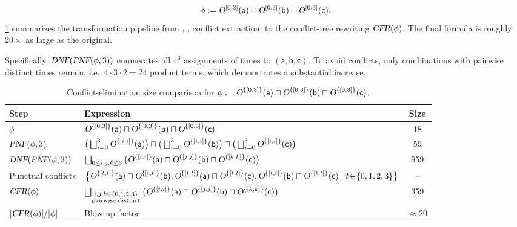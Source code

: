 \begin{example}
\[
\phi :=
\textsl{O}^{{[0,3]}}(\mathsf{\mathsf{a}}) \sqcap
\textsl{O}^{{[0,3]}}(\mathsf{\mathsf{b}}) \sqcap
\textsl{O}^{{[0,3]}}(\mathsf{\mathsf{c}}).
\]
\ref{table:ontic-triple-conflict} summarizes the transformation pipeline from \pnf, \dnf, conflict extraction, to the conflict-free rewriting $\textsl{CFR}(\phi)$.
The final formula is roughly $20\times$ as large as the original.

Specifically, $\textsl{DNF}(\textsl{PNF}(\phi,3))$ enumerates all $4^3$ assignments of times to $(\mathsf{a},\mathsf{b},\mathsf{c})$.
To avoid conflicts, only combinations with pairwise distinct times remain, i.e.\ $4\cdot3\cdot2=24$ product terms, which demonstrates a substantial increase.


\begin{table}[h]
\centering
\renewcommand{\arraystretch}{1.4}
\begin{tabular}{|l|p{8cm}|c|}
\hline
\textbf{Step} & \textbf{Expression} & \textbf{Size} \\ \hline
$\phi$ 
& $\textsl{O}^{\{[0,3]\}}(\mathsf{\mathsf{a}})\sqcap\textsl{O}^{\{[0,3]\}}(\mathsf{\mathsf{b}})\sqcap\textsl{O}^{\{[0,3]\}}(\mathsf{\mathsf{c}})$
& 18 \\ \hline
$\textsl{PNF}(\phi,3)$ 
& $\big(\bigsqcup_{i=0}^{3}\textsl{O}^{\{[i,i]\}}(\mathsf{\mathsf{a}})\big)
\sqcap\big(\bigsqcup_{i=0}^{3}\textsl{O}^{\{[i,i]\}}(\mathsf{\mathsf{b}})\big)
\sqcap\big(\bigsqcup_{i=0}^{3}\textsl{O}^{\{[i,i]\}}(\mathsf{\mathsf{c}})\big)$
& 59 \\ \hline
$\textsl{DNF}(\textsl{PNF}(\phi,3))$ 
& $\bigsqcup_{0\le i,j,k\le3}
  \big(\textsl{O}^{\{[i,i]\}}(\mathsf{\mathsf{a}})\sqcap
       \textsl{O}^{\{[j,j]\}}(\mathsf{\mathsf{b}})\sqcap
       \textsl{O}^{\{[k,k]\}}(\mathsf{\mathsf{c}})\big)$
& 959 \\ \hline
Punctual conflicts 
& $\big\{
\textsl{O}^{\{[t,t]\}}(\mathsf{\mathsf{a}})\sqcap\textsl{O}^{\{[t,t]\}}(\mathsf{\mathsf{b}}),
\textsl{O}^{\{[t,t]\}}(\mathsf{\mathsf{a}})\sqcap\textsl{O}^{\{[t,t]\}}(\mathsf{\mathsf{c}}),
\textsl{O}^{\{[t,t]\}}(\mathsf{\mathsf{b}})\sqcap\textsl{O}^{\{[t,t]\}}(\mathsf{\mathsf{c}})
\mid t\!\in\!\{0,1,2,3\}\big\}$ 
& -- \\ \hline
$\textsl{CFR}(\phi)$
& $\bigsqcup_{\substack{i,j,k\in\{0,1,2,3\}\\ \text{pairwise distinct}}}
  \big(\textsl{O}^{\{[i,i]\}}(\mathsf{\mathsf{a}})\sqcap
       \textsl{O}^{\{[j,j]\}}(\mathsf{\mathsf{b}})\sqcap
       \textsl{O}^{\{[k,k]\}}(\mathsf{\mathsf{c}})\big)$
& 359 \\ \hline
$\vert \textsl{CFR}(\phi)\vert/\vert \phi\vert$ 
& Blow-up factor & $\approx20$ \\ \hline
\end{tabular}
\caption{Conflict-elimination size comparison for 
$\phi := \textsl{O}^{\{[0,3]\}}(\mathsf{\mathsf{a}}) \sqcap \textsl{O}^{\{[0,3]\}}(\mathsf{\mathsf{b}}) \sqcap \textsl{O}^{\{[0,3]\}}(\mathsf{\mathsf{c}})$.}
\label{table:ontic-triple-conflict}
\end{table}
\end{example}


